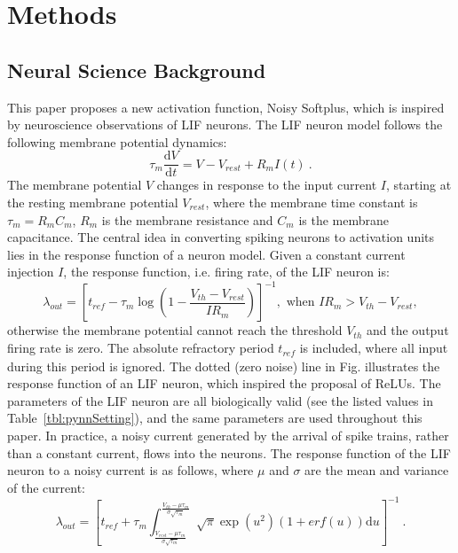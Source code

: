 \documentclass[runningheads,a4paper]{llncs}
\def\D{\mathrm{d}}
\begin{document}
	\section{Methods}
	\subsection{Neural Science Background}
	This paper proposes a new activation function, Noisy Softplus, which is inspired by neuroscience observations of LIF neurons.
	The LIF neuron model follows the following membrane potential dynamics:
	\begin{equation}
	\tau_m \frac{\D V}{\D t}=V - V_{rest} + R_{m} I(t) ~.
	\label{eq:LIF}
	\end{equation}
	The membrane potential $V$ changes in response to the input current $I$, starting at the resting membrane potential $V_{rest}$, where the membrane time constant is $\tau_m = R_mC_m$, $R_m$ is the membrane resistance and $C_m$ is the membrane capacitance.
	The central idea in converting spiking neurons to activation units lies in the response function of a neuron model.
	Given a constant current injection $I$, the response function, i.e. firing rate, of the LIF neuron is:
	\begin{equation}
	\lambda_\mathit{out}=
	\left [ t_\mathit{ref}-\tau_m\log \left ( 1-\frac{V_{th}-V_\mathit{rest}}{IR_m}  \right )\right ]^{-1}, \textrm{~when~} IR_m>V_{th}-V_{rest},
	\label{equ:consI}
	\end{equation}
	otherwise the membrane potential cannot reach the threshold $V_{th}$ and the output firing rate is zero. 
	The absolute refractory period $t_\mathit{ref}$ is included, where all input during this period is ignored.
	The dotted (zero noise) line in Fig. illustrates the response function of an LIF neuron, which inspired the proposal of ReLUs.
	The parameters of the LIF neuron are all biologically valid (see the listed values in Table~\ref{tbl:pynnSetting}), and the same parameters are used throughout this paper.
	In practice, a noisy current generated by the arrival of spike trains, rather than a constant current, flows into the neurons.
	The response function
	of the LIF neuron to a noisy current is as follows, where $\mu$ and $\sigma$ are the mean and variance of the current:
	\begin{equation}
	\lambda_\mathit{out}=
	\left [ t_\mathit{ref}+\tau_m \int_{\frac{V_\mathit{rest}-\mu \tau_m }{\sigma \sqrt{\tau_m}}}^{\frac{V_{th}-\mu \tau_m }{\sigma \sqrt{\tau_m}}} \sqrt{\pi} \exp(u^{2}) (1+erf(u)) \D u \right ]^{-1} ~.
	\label{equ:noiseI}
	\end{equation}
	
\end{document}
